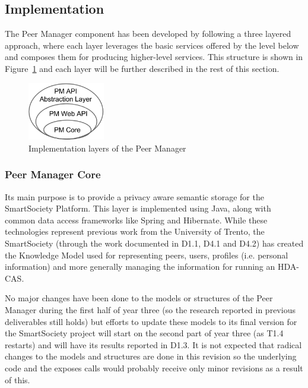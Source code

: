 \subsection{Implementation}

The Peer Manager component has been developed by following a three layered approach, where each layer leverages the basic services offered by the level below and composes them for producing higher-level services. This structure is shown in Figure~\ref{fig:pm-component-layers} and each layer will be further described in the rest of this section. 

\begin{figure}[htbp]
\centering
\includegraphics[width=0.3\textwidth]{figures/pm-component-layers.png}
\caption{Implementation layers of the Peer Manager}
\label{fig:pm-component-layers}
\end{figure}


\subsubsection{Peer Manager Core}
Its main purpose is to provide a privacy aware semantic storage for the SmartSociety Platform. This layer is implemented using Java, along with common data access frameworks like Spring and Hibernate.
While these technologies represent previous work from the University of Trento, the SmartSociety (through the work documented in D1.1, D4.1 and D4.2) has created the Knowledge Model used for representing peers, users, profiles (i.e. personal information) and more generally managing the information for running an HDA-CAS.

No major changes have been done to the models or structures of the Peer Manager during the first half of year three (so the research reported in previous deliverables still holds) but efforts to update these models to its final version for the SmartSociety project will start on the second part of year three (as T1.4 restarts) and will have its results reported in D1.3. It is not expected that radical changes to the models and structures are done in this revision so the underlying code and the exposes calls would probably receive only minor revisions as a result of this. 

